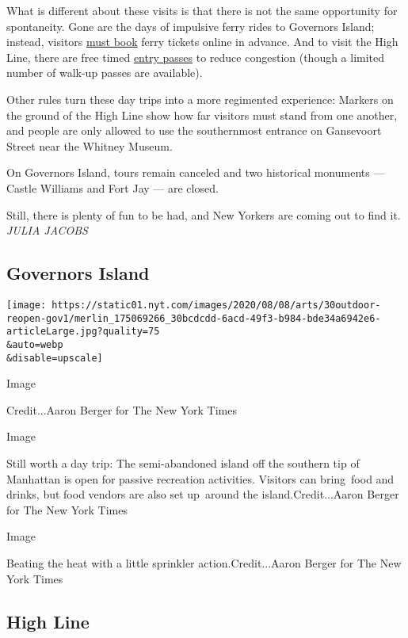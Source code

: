 What is different about these visits is that there is not the same
opportunity for spontaneity. Gone are the days of impulsive ferry rides
to Governors Island; instead, visitors
\href{https://govisland.com/visit-the-island/ferry}{must book} ferry
tickets online in advance. And to visit the High Line, there are free
timed
\href{https://www.thehighline.org/visit/?utm_source=signage\&utm_medium=signage\&utm_campaign=visit\&utm_content=welcome}{entry
passes} to reduce congestion (though a limited number of walk-up passes
are available).

Other rules turn these day trips into a more regimented experience:
Markers on the ground of the High Line show how far visitors must stand
from one another, and people are only allowed to use the southernmost
entrance on Gansevoort Street near the Whitney Museum.

On Governors Island, tours remain canceled and two historical monuments
--- Castle Williams and Fort Jay --- are closed.

Still, there is plenty of fun to be had, and New Yorkers are coming out
to find it. \emph{JULIA JACOBS}

\hypertarget{governors-island}{%
\subsection{Governors Island}\label{governors-island}}

\texttt{[image: https://static01.nyt.com/images/2020/08/08/arts/30outdoor-reopen-gov1/merlin\_175069266\_30bcdcdd-6acd-49f3-b984-bde34a6942e6-articleLarge.jpg?quality=75\\\&auto=webp\\\&disable=upscale]}

Image

Credit...Aaron Berger for The New York Times

Image

Still worth a day trip: The semi-abandoned island off the southern tip
of Manhattan is open for passive recreation activities. Visitors can
bring~food and drinks, but food vendors are also set up~around the
island.Credit...Aaron Berger for The New York Times

Image

Beating the heat with a little sprinkler action.Credit...Aaron Berger
for The New York Times

\hypertarget{high-line}{%
\subsection{High Line}\label{high-line}}

